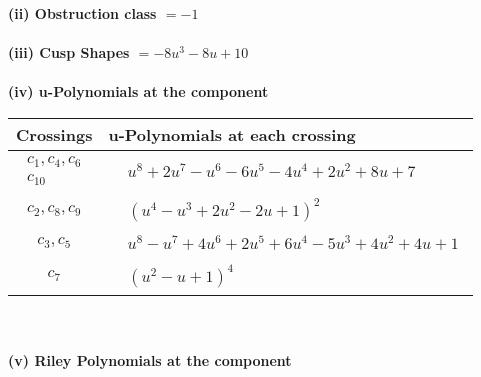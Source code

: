\documentclass[1p]{elsarticle_modified}
\theoremstyle{definition}
\begin{document}
\flushleft \textbf{(ii) Obstruction class $= -1$}\\~\\
\flushleft \textbf{(iii) Cusp Shapes $= -8 u^3-8 u+10$}\\~\\
\newpage\renewcommand{\arraystretch}{1}
\flushleft \textbf{(iv) u-Polynomials at the component}\newline \\
\begin{tabular}{m{50pt}|m{274pt}}
Crossings & \hspace{64pt}u-Polynomials at each crossing \\
\hline $$\begin{aligned}c_{1},c_{4},c_{6}\\c_{10}\end{aligned}$$&$\begin{aligned}
&u^8+2 u^7- u^6-6 u^5-4 u^4+2 u^2+8 u+7
\end{aligned}$\\
\hline $$\begin{aligned}c_{2},c_{8},c_{9}\end{aligned}$$&$\begin{aligned}
&(u^4- u^3+2 u^2-2 u+1)^2
\end{aligned}$\\
\hline $$\begin{aligned}c_{3},c_{5}\end{aligned}$$&$\begin{aligned}
&u^8- u^7+4 u^6+2 u^5+6 u^4-5 u^3+4 u^2+4 u+1
\end{aligned}$\\
\hline $$\begin{aligned}c_{7}\end{aligned}$$&$\begin{aligned}
&(u^2- u+1)^4
\end{aligned}$\\
\hline
\end{tabular}\\~\\
\newpage\renewcommand{\arraystretch}{1}
\flushleft \textbf{(v) Riley Polynomials at the component}\newline \\
\end{document}
